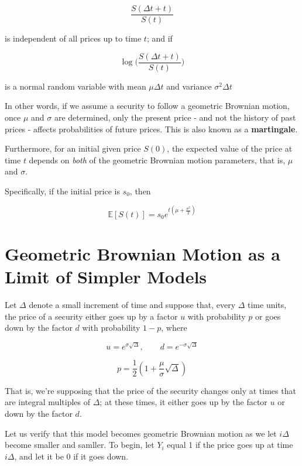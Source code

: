 \documentclass[12pt]{article}
\begin{document}
\[
\frac{S(\Delta t +t)}{S(t)}
\]

is independent of all prices up to time $t$; and if 

\[
\log \biggl( \frac{S(\Delta t+t)}{S(t)} \biggr)
\]

is a normal random variable with mean $\mu{\Delta t}$ and variance $\sigma^2 \Delta t$

\noindent {}

In other words, if we assume a security to follow a geometric Brownian motion, once $\mu$ and $\sigma$ are determined, only the present price - and not the history of past prices - affects probabilities of future prices. This is also known as a \textbf{martingale}.

Furthermore, for an initial given price $S(0)$, the expected value of the price at time $t$ depends on \textit{both} of the geometric Brownian motion parameters, that is, $\mu$ and $\sigma$.

Specifically, if the initial price is $s_0$, then 

\[
\mathbb{E} [S(t)] = s_0 e^{t(\mu + \frac{\sigma^2}{2})}
\]

\section{Geometric Brownian Motion as a Limit of Simpler Models}

Let $\Delta$ denote a small increment of time and suppose that, every $\Delta$ time units, the price of a security either goes up by a factor $u$ with probability $p$ or goes down by the factor $d$ with probability $1 - p$, where

\[
u = e^{\sigma \sqrt{\Delta}},\qquad d = e^{-\sigma\sqrt{\Delta}}
\]

\[
p = \frac{1}{2} \left( 1 + \frac{\mu}{\sigma}\sqrt{\Delta} \right)
\]

That is, we're supposing that the price of the security changes only at times that are integral multiples of $\Delta$; at these times, it either goes up by the factor $u$ or down by the factor $d$.

Let us verify that this model becomes geometric Brownian motion as we let $i \Delta$ become smaller and samller. To begin, let $Y_i$ equal 1 if the price goes up at time $i \Delta$, and let it be 0 if it goes down.
\end{document}
